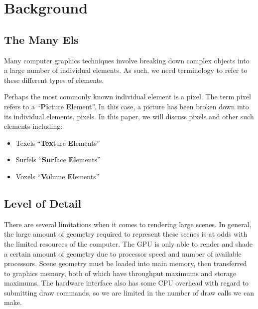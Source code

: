 
\iffalse  \fi

\chapter{Background}




\section{The Many Els}

Many computer graphics techniques involve breaking down complex objects into a large number of individual elements.
As such, we need terminology to refer to these different types of elements.

Perhaps the most commonly known individual element is a pixel.
The term pixel refers to a ``\textbf{Pi}cture \textbf{El}ement''.
In this case, a picture has been broken down into its individual elements, pixels.
In this paper, we will discuss pixels and other such elements including:

\begin{itemize}
	\item Texels ``\textbf{Tex}ture \textbf{El}ements''
	\item Surfels ``\textbf{Surf}ace \textbf{El}ements''
	\item Voxels ``\textbf{Vo}lume \textbf{El}ements''
\end{itemize}


\section{Level of Detail}

There are several limitations when it comes to rendering large scenes.
In general, the large amount of geometry required to represent these scenes is at odds with the limited resources of the computer.
The GPU is only able to render and shade a certain amount of geometry due to processor speed and number of available processors.
Scene geometry must be loaded into main memory, then transferred to graphics memory, both of which have throughput maximums and storage maximums.
The hardware interface also has some CPU overhead with regard to submitting draw commands, so we are limited in the number of draw calls we can make.

